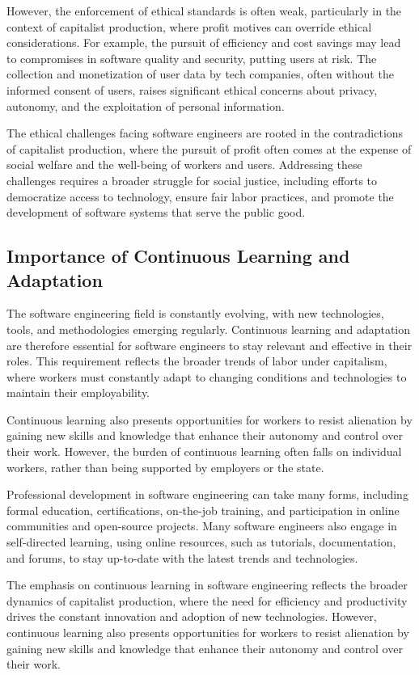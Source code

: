 \begin{refsection}
\begin{multicols}{2}
{However, the enforcement of ethical standards is often weak, particularly in the context of capitalist production, where profit motives can override ethical considerations. For example, the pursuit of efficiency and cost savings may lead to compromises in software quality and security, putting users at risk. The collection and monetization of user data by tech companies, often without the informed consent of users, raises significant ethical concerns about privacy, autonomy, and the exploitation of personal information.

The ethical challenges facing software engineers are rooted in the contradictions of capitalist production, where the pursuit of profit often comes at the expense of social welfare and the well-being of workers and users. Addressing these challenges requires a broader struggle for social justice, including efforts to democratize access to technology, ensure fair labor practices, and promote the development of software systems that serve the public good.

\subsection{Importance of Continuous Learning and Adaptation}

The software engineering field is constantly evolving, with new technologies, tools, and methodologies emerging regularly. Continuous learning and adaptation are therefore essential for software engineers to stay relevant and effective in their roles. This requirement reflects the broader trends of labor under capitalism, where workers must constantly adapt to changing conditions and technologies to maintain their employability.

Continuous learning also presents opportunities for workers to resist alienation by gaining new skills and knowledge that enhance their autonomy and control over their work. However, the burden of continuous learning often falls on individual workers, rather than being supported by employers or the state.

Professional development in software engineering can take many forms, including formal education, certifications, on-the-job training, and participation in online communities and open-source projects. Many software engineers also engage in self-directed learning, using online resources, such as tutorials, documentation, and forums, to stay up-to-date with the latest trends and technologies.

The emphasis on continuous learning in software engineering reflects the broader dynamics of capitalist production, where the need for efficiency and productivity drives the constant innovation and adoption of new technologies. However, continuous learning also presents opportunities for workers to resist alienation by gaining new skills and knowledge that enhance their autonomy and control over their work.
}
\newpage
\end{multicols}

\end{refsection}
